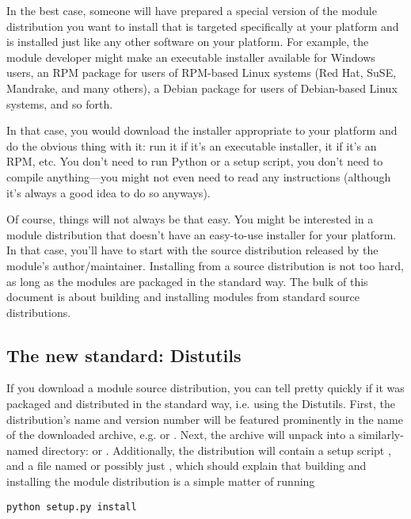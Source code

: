 \documentclass{howto}
\begin{document}
In the best case, someone will have prepared a special version of the
module distribution you want to install that is targeted specifically at
your platform and is installed just like any other software on your
platform.  For example, the module developer might make an executable
installer available for Windows users, an RPM package for users of
RPM-based Linux systems (Red Hat, SuSE, Mandrake, and many others), a
Debian package for users of Debian-based Linux systems, and so forth.

In that case, you would download the installer appropriate to your
platform and do the obvious thing with it: run it if it's an executable
installer,  it if it's an RPM, etc.  You don't need
to run Python or a setup script, you don't need to compile
anything---you might not even need to read any instructions (although
it's always a good idea to do so anyways).

Of course, things will not always be that easy.  You might be interested
in a module distribution that doesn't have an easy-to-use installer for
your platform.  In that case, you'll have to start with the source
distribution released by the module's author/maintainer.  Installing
from a source distribution is not too hard, as long as the modules are
packaged in the standard way.  The bulk of this document is about
building and installing modules from standard source distributions.


\subsection{The new standard: Distutils}
\label{new-standard}

If you download a module source distribution, you can tell pretty
quickly if it was packaged and distributed in the standard way, i.e.
using the Distutils.  First, the distribution's name and version number
will be featured prominently in the name of the downloaded archive, e.g.
 or .  Next, the archive
will unpack into a similarly-named directory:  or
.  Additionally, the distribution will contain a
setup script , and a file named  or possibly
just , which should explain that building and installing the
module distribution is a simple matter of running

\begin{verbatim}
python setup.py install
\end{verbatim}
\end{document}
